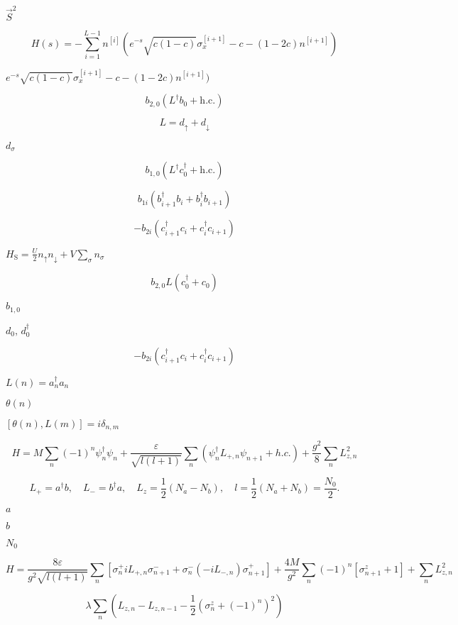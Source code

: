 \documentclass{article}
\begin{document}
{$\vec{S}^2$
\pagebreak

\[
H(s)=-\sum_{i=1}^{L-1} n^{[i]} \left ( e^{-s} \sqrt{c(1-c)} \sigma_x^{[i+1]}-c-(1-2c)n^{[i+1]}\right )
\]
\pagebreak

$ e^{-s} \sqrt{c(1-c)}
\sigma_x^{[i+1]}-c-(1-2c)n^{[i+1]})$
\pagebreak

\[b_{2,0}\left ( L^{\dagger}
b_0+\mathrm{h.c.}\right)\]
\pagebreak

\[L=d_{\uparrow}+d_{\downarrow}\]
\pagebreak

$d_{\sigma}$
\pagebreak

\[b_{1,0}\left (
L^{\dagger}c_0^{\dagger} + \mathrm{h.c.}  \right)\]
\pagebreak

\[b_{1 i}
\left(b_{i+1}^{\dagger}b_i+b_{i}^{\dagger}b_{i+1}\right)\]
\pagebreak

\[-
b_{2 i}
\left(c_{i+1}^{\dagger}c_i+c_{i}^{\dagger}c_{i+1}\right)\]
\pagebreak

$H_{\mathrm{S}}=\frac{U}{2}n_{\uparrow}n_{\downarrow}+V\sum_{\sigma}
n_{\sigma}$
\pagebreak

\[b_{2,0} L\left(c_0^{\dagger}+c_0\right)\]
\pagebreak

$b_{1,0}$
\pagebreak

$d_0,\,d_0^{\dagger}$
\pagebreak

\[- b_{2 i}
\left(c_{i+1}^{\dagger}c_i+c_{i}^{\dagger}c_{i+1}\right)\]
\pagebreak

$ L(n) = a_n^\dagger a_n $
\pagebreak

$ \theta(n) $
\pagebreak

$ [\theta(n),L(m)]=i\delta_{n,m} $
\pagebreak

\[ H = M\sum_n (-1)^n\psi_n^\dagger\psi_n + \frac{\varepsilon}{\sqrt{l(l+1)}}\sum_n \left(\psi_n^\dagger L_{+,n}\psi_{n+1}+h.c.\right)+\frac{g^2}{8}\sum_n L_{z,n}^2\]
\pagebreak

\[L_+ = a^\dagger b,\quad L_- = b^\dagger a,\quad L_z = \frac{1}{2}(N_a - N_b),\quad l=\frac{1}{2}(N_a+N_b) = \frac{N_0}{2}.  \]
\pagebreak

$ a$
\pagebreak

$ b $
\pagebreak

$ N_{0} $
\pagebreak

\[H = \frac{8\varepsilon}{g^2\sqrt{l(l+1)}}\sum_n\left[\sigma^+_n iL_{+,n}\sigma_{n+1}^- + \sigma^-_n (-iL_{-,n})\sigma_{n+1}^+\right] + \frac{4M}{g^2}\sum_n(-1)^n\left[ \sigma^z_{n+1}+1\right] + \sum_n L_{z,n}^2  \]
\pagebreak

\[ \lambda \sum_n\left( L_{z,n} - L_{z,n-1} -\frac{1}{2}\left(\sigma^z_n +(-1)^n\right)^2\right)\]
\pagebreak

}
\end{document}
